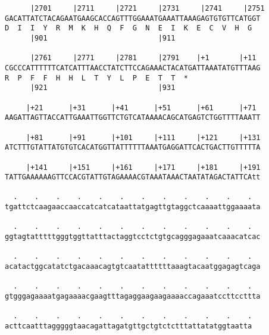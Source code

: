 \documentclass{article}
\begin{document}
\begin{Verbatim}
      |2701     |2711     |2721     |2731     |2741     |2751
GACATTATCTACAGAATGAAGCACCAGTTTGGAAATGAAATTAAAGAGTGTGTTCATGGT
D  I  I  Y  R  M  K  H  Q  F  G  N  E  I  K  E  C  V  H  G  
      |901                          |911                    
  
      |2761     |2771     |2781     |2791    |+1       |+11 
CGCCCATTTTTTCATCATTTAACCTATCTTCCAGAAACTACATGATTAAATATGTTTAAG
R  P  F  F  H  H  L  T  Y  L  P  E  T  T  *   
      |921                          |931                    
  
     |+21      |+31      |+41      |+51      |+61      |+71 
AAGATTAGTTACCATTGAAATTGGTTCTGTCATAAAACAGCATGAGTCTGGTTTTAAATT
                                                            
     |+81      |+91      |+101     |+111     |+121     |+131
ATCTTTGTATTATGTGTCACATGGTTATTTTTTAAATGAGGATTCACTGACTTGTTTTTA
                                                            
     |+141     |+151     |+161     |+171     |+181     |+191
TATTGAAAAAAGTTCCACGTATTGTAGAAAACGTAAATAAACTAATATAGACTATTCAtt
                                                            
  .    .    .    .    .    .    .    .    .    .    .    .  
tgattctcaagaaccaaccatcatcataattatgagttgtaggctcaaaattggaaaata
                                                            
  .    .    .    .    .    .    .    .    .    .    .    .  
ggtagtatttttgggtggttatttactaggtcctctgtgcagggagaaatcaaacatcac
                                                            
  .    .    .    .    .    .    .    .    .    .    .    .  
acatactggcatatctgacaaacagtgtcaatattttttaaagtacaatggagagtcaga
                                                            
  .    .    .    .    .    .    .    .    .    .    .    .  
gtgggagaaaatgagaaaacgaagtttagaggaagaagaaaaccagaaatccttccttta
                                                            
  .    .    .    .    .    .    .    .    .    .    .    .
acttcaatttagggggtaacagattagatgttgctgtctctttattatatggtaatta
                                                          
                                                          
\end{Verbatim}
\end{document}
